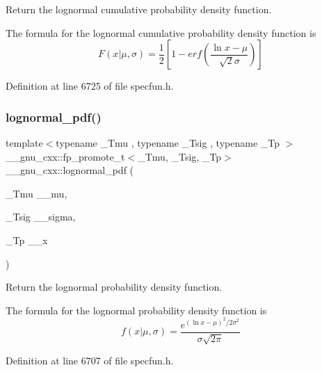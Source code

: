 Return the lognormal cumulative probability density function. 

The formula for the lognormal cumulative probability density function is \[ F(x|\mu,\sigma) = \frac{1}{2}\left[1-erf\left( \frac{\ln{x}-\mu}{\sqrt{2}\sigma}\right)\right] \] 

Definition at line 6725 of file specfun.\+h.

\mbox{\label{group__gnu__math__spec__func_gaef4db41e58e53144df2ddcc834d88e0b}} 
\subsubsection{\texorpdfstring{lognormal\+\_\+pdf()}{lognormal\_pdf()}}
{\footnotesize\ttfamily template$<$typename \+\_\+\+Tmu , typename \+\_\+\+Tsig , typename \+\_\+\+Tp $>$ \\
\+\_\+\+\_\+gnu\+\_\+cxx\+::fp\+\_\+promote\+\_\+t$<$\+\_\+\+Tmu, \+\_\+\+Tsig, \+\_\+\+Tp$>$ \+\_\+\+\_\+gnu\+\_\+cxx\+::lognormal\+\_\+pdf (\begin{DoxyParamCaption}\item[{\+\_\+\+Tmu}]{\+\_\+\+\_\+mu,  }\item[{\+\_\+\+Tsig}]{\+\_\+\+\_\+sigma,  }\item[{\+\_\+\+Tp}]{\+\_\+\+\_\+x }\end{DoxyParamCaption})\hspace{0.3cm}{\ttfamily [inline]}}



Return the lognormal probability density function. 

The formula for the lognormal probability density function is \[ f(x|\mu,\sigma) = \frac{e^{(\ln{x}-\mu)^2/2\sigma^2}}{\sigma\sqrt{2\pi}} \] 

Definition at line 6707 of file specfun.\+h.

\mbox{\label{group__gnu__math__spec__func_ga8912b75b2f7592fb61128c766e7313b9}} 
